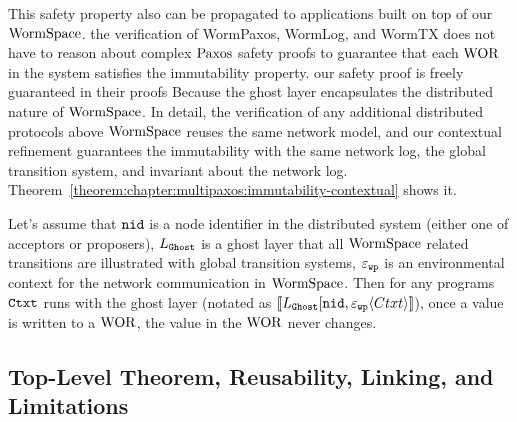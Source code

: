 This safety property also can be propagated to  applications built on top of our $\mathrm{WormSpace}$.
the verification of WormPaxos, WormLog, and WormTX does not have to reason about complex 
$\mathrm{Paxos}$ safety proofs to 
guarantee that each $\mathrm{WOR}$ in the system satisfies 
the immutability property.
our safety proof is freely guaranteed in their proofs 
Because the ghost layer encapsulates the distributed nature of $\mathrm{WormSpace}$.
In detail, the verification of any additional distributed protocols above $\mathrm{WormSpace}$ reuses 
the same network model, and our contextual refinement guarantees the 
immutability with the same network log, the global transition system, and invariant about the network log.
Theorem~\ref{theorem:chapter:multipaxos:immutability-contextual} shows it.
\begin{theorem}
\label{theorem:chapter:multipaxos:immutability-contextual}
Let's assume that ${\mathrm{\texttt{nid}}}$ is a node identifier in the distributed system (either one of acceptors or proposers),
$L_{{\mathrm{\texttt{Ghost}}}}$ is a ghost layer that all $\mathrm{WormSpace}$ related transitions are illustrated with global transition systems, 
${\varepsilon}_{{\mathrm{\texttt{wp}}}}$ is an environmental context for the network communication in $\mathrm{WormSpace}$.
Then for any programs ${\mathrm{\texttt{Ctxt}}}$ runs with the ghost layer (notated as
$[\![{L_{{\mathrm{\texttt{Ghost}}}}[{\mathrm{\texttt{nid}}}, {\varepsilon}_{{\mathrm{\texttt{wp}}}}} \langle {Ctxt} \rangle]\!]$),
once a value is written to a $\mathrm{WOR}$, the value in the $\mathrm{WOR}$ never changes.
 \end{theorem}

\subsection{Top-Level Theorem, Reusability, Linking, and Limitations}
\label{chapter:multipaxos:top-level-theorem-reusability-linking-limitations}

